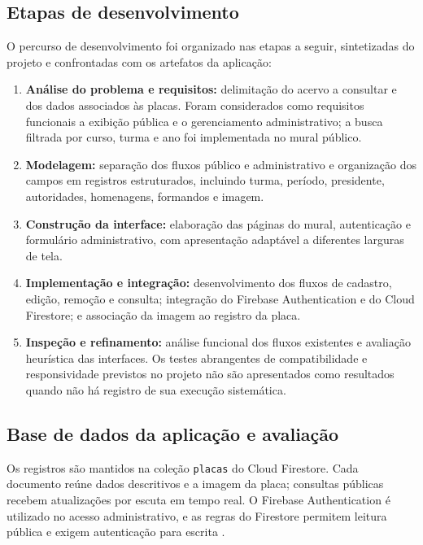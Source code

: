 \documentclass[12pt]{article}
\begin{document}
\subsection{Etapas de desenvolvimento}

O percurso de desenvolvimento foi organizado nas etapas a seguir, sintetizadas
do projeto e confrontadas com os artefatos da aplicação:

\begin{enumerate}
  \item \textbf{Análise do problema e requisitos:} delimitação do acervo a
    consultar e dos dados associados às placas. Foram considerados como
    requisitos funcionais a exibição pública e o gerenciamento administrativo;
    a busca filtrada por curso, turma e ano foi implementada no mural público.
  \item \textbf{Modelagem:} separação dos fluxos público e administrativo e
    organização dos campos em registros estruturados, incluindo turma, período,
    presidente, autoridades, homenagens, formandos e imagem.
  \item \textbf{Construção da interface:} elaboração das páginas do mural,
    autenticação e formulário administrativo, com apresentação adaptável a
    diferentes larguras de tela.
  \item \textbf{Implementação e integração:} desenvolvimento dos fluxos de
    cadastro, edição, remoção e consulta; integração do Firebase Authentication
    e do Cloud Firestore; e associação da imagem ao registro da placa.
  \item \textbf{Inspeção e refinamento:} análise funcional dos fluxos existentes
    e avaliação heurística das interfaces. Os testes abrangentes de
    compatibilidade e responsividade previstos no projeto não são apresentados
    como resultados quando não há registro de sua execução sistemática.
\end{enumerate}

\subsection{Base de dados da aplicação e avaliação}

Os registros são mantidos na coleção \texttt{placas} do Cloud Firestore. Cada
documento reúne dados descritivos e a imagem da placa; consultas públicas
recebem atualizações por escuta em tempo real. O Firebase Authentication é
utilizado no acesso administrativo, e as regras do Firestore permitem leitura
pública e exigem autenticação para escrita \cite{firebaseauth,firestorelisten,
firestoresecurity}.
\end{document}
